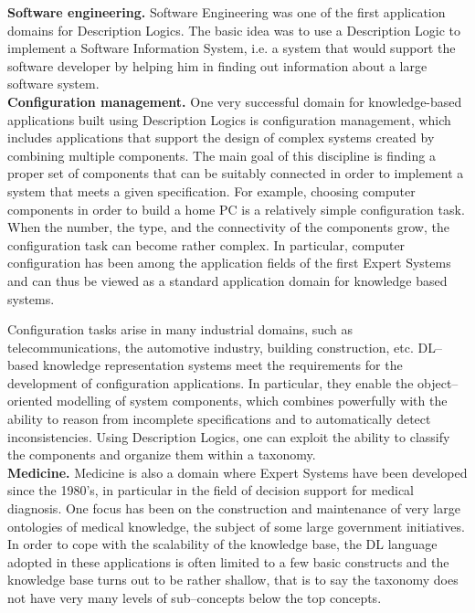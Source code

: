 \documentclass[a4paper, 11pt, oneside]{duthesis}
\begin{document}
\textbf{Software engineering.} Software Engineering was one of the first application domains for Description Logics. The basic idea was to use a Description Logic to implement a Software Information System, i.e. a system that would support the software developer by helping him in finding out information about a large software system.\\

\textbf{Configuration management.} One very successful domain for knowledge-based applications built using Description Logics is configuration management, which includes applications that support the design of complex systems created by combining multiple components.
The main goal of this discipline is finding a proper set of components that can be suitably connected in order to implement a system that meets a given specification.
For example, choosing computer components in order to build a home PC is a relatively simple configuration task.
When the number, the type, and the connectivity of the components grow, the configuration task can become rather complex.
In particular, computer configuration has been among the application fields of the first Expert Systems and can thus be viewed as a standard application domain for knowledge based systems.

Configuration tasks arise in many industrial domains, such as telecommunications, the automotive industry, building construction, etc.
DL--based knowledge representation systems meet the requirements for the development of configuration applications.
In particular, they enable the object--oriented modelling of system components, which combines powerfully with the ability to reason from incomplete specifications and to automatically detect inconsistencies.
Using Description Logics, one can exploit the ability to classify the components and organize them within a taxonomy.\\

\textbf{Medicine.} Medicine is also a domain where Expert Systems have been developed since the 1980’s, in particular in the field of decision support for medical diagnosis. One focus has been on the construction and maintenance of very large ontologies of medical knowledge, the subject of some large government initiatives.
In order to cope with the scalability of the knowledge base, the DL language adopted in these applications is often limited to a few basic constructs and the knowledge base turns out to be rather shallow, that is to say the taxonomy does not have very many levels of sub--concepts below the top concepts.\\
\end{document}
